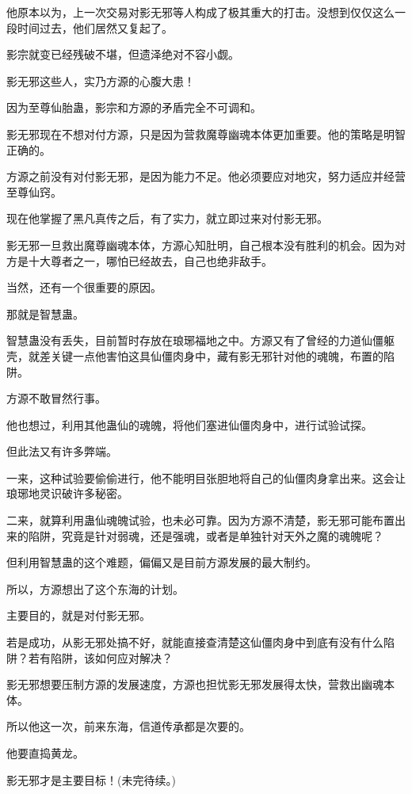 \begin{this_body}
他原本以为，上一次交易对影无邪等人构成了极其重大的打击。没想到仅仅这么一段时间过去，他们居然又复起了。

影宗就变已经残破不堪，但遗泽绝对不容小觑。

影无邪这些人，实乃方源的心腹大患！

因为至尊仙胎蛊，影宗和方源的矛盾完全不可调和。

影无邪现在不想对付方源，只是因为营救魔尊幽魂本体更加重要。他的策略是明智正确的。

方源之前没有对付影无邪，是因为能力不足。他必须要应对地灾，努力适应并经营至尊仙窍。

现在他掌握了黑凡真传之后，有了实力，就立即过来对付影无邪。

影无邪一旦救出魔尊幽魂本体，方源心知肚明，自己根本没有胜利的机会。因为对方是十大尊者之一，哪怕已经故去，自己也绝非敌手。

当然，还有一个很重要的原因。

那就是智慧蛊。

智慧蛊没有丢失，目前暂时存放在琅琊福地之中。方源又有了曾经的力道仙僵躯壳，就差关键一点他害怕这具仙僵肉身中，藏有影无邪针对他的魂魄，布置的陷阱。

方源不敢冒然行事。

他也想过，利用其他蛊仙的魂魄，将他们塞进仙僵肉身中，进行试验试探。

但此法又有许多弊端。

一来，这种试验要偷偷进行，他不能明目张胆地将自己的仙僵肉身拿出来。这会让琅琊地灵识破许多秘密。

二来，就算利用蛊仙魂魄试验，也未必可靠。因为方源不清楚，影无邪可能布置出来的陷阱，究竟是针对弱魂，还是强魂，或者是单独针对天外之魔的魂魄呢？

但利用智慧蛊的这个难题，偏偏又是目前方源发展的最大制约。

所以，方源想出了这个东海的计划。

主要目的，就是对付影无邪。

若是成功，从影无邪处搞不好，就能直接查清楚这仙僵肉身中到底有没有什么陷阱？若有陷阱，该如何应对解决？

影无邪想要压制方源的发展速度，方源也担忧影无邪发展得太快，营救出幽魂本体。

所以他这一次，前来东海，信道传承都是次要的。

他要直捣黄龙。

影无邪才是主要目标！(未完待续。)

\end{this_body}

